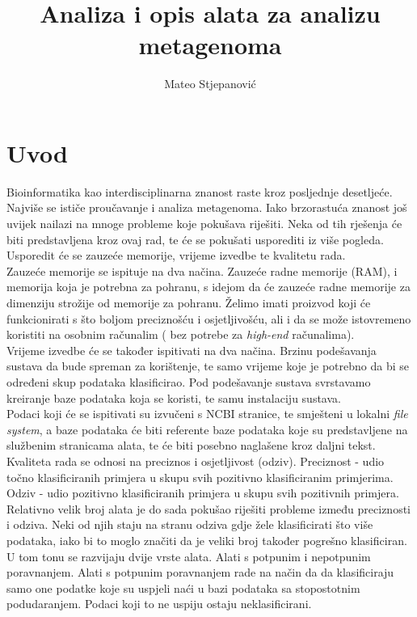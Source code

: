 \documentclass[times, utf8, seminar]{fer}
\begin{document}
\title{Analiza i opis alata za analizu metagenoma}

\author{Mateo Stjepanović}


\maketitle

\tableofcontents

\chapter{Uvod}
Bioinformatika kao interdisciplinarna znanost raste kroz posljednje desetljeće. Najviše se ističe proučavanje i analiza metagenoma. Iako brzorastuća znanost još uvijek nailazi na mnoge probleme koje pokušava riješiti. Neka od tih rješenja će biti predstavljena kroz ovaj rad, te će se pokušati usporediti iz više pogleda. Usporedit će se zauzeće memorije, vrijeme izvedbe te kvalitetu rada.
\\Zauzeće memorije se ispituje na dva načina. Zauzeće radne memorije (RAM), i memorija koja je potrebna za pohranu, s idejom da će zauzeće radne memorije za dimenziju strožije od memorije za pohranu. Želimo imati proizvod koji će funkcionirati s što boljom preciznošću i osjetljivošću, ali i da se može istovremeno koristiti na osobnim računalim ( bez potrebe za \textit{high-end} računalima).
\\Vrijeme izvedbe će se također ispitivati na dva načina. Brzinu podešavanja sustava da bude spreman za korištenje, te samo vrijeme koje je potrebno da bi se određeni skup podataka klasificirao. Pod podešavanje sustava svrstavamo kreiranje baze podataka koja se koristi, te samu instalaciju sustava.
\\Podaci koji će se ispitivati su izvučeni s NCBI stranice, te smješteni u lokalni \textit{file system}, a baze podataka će biti referente baze podataka koje su predstavljene na službenim stranicama alata, te će biti posebno naglašene kroz daljni tekst.
\\Kvaliteta rada se odnosi na preciznos i osjetljivost (odziv). Preciznost - udio točno klasificiranih primjera u skupu svih pozitivno klasificiranim primjerima. Odziv - udio pozitivno klasificiranih primjera u skupu svih pozitivnih primjera.
\\Relativno velik broj alata je do sada pokušao riješiti probleme između preciznosti i odziva. Neki od njih staju na stranu odziva gdje žele klasificirati što više podataka, iako bi to moglo značiti da je veliki broj također pogrešno klasificiran. U tom tonu se razvijaju dvije vrste alata. Alati s potpunim i nepotpunim poravnanjem. Alati s potpunim poravnanjem rade na način da da klasificiraju samo one podatke koje su uspjeli naći u bazi podataka sa stopostotnim podudaranjem. Podaci koji to ne uspiju ostaju neklasificirani.
\end{document}
